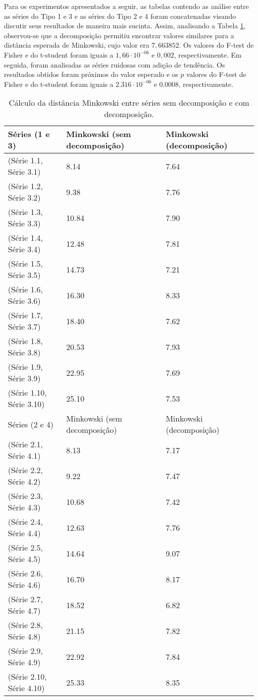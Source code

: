 Para os experimentos apresentados a seguir, as tabelas contendo as análise entre as séries do Tipo 1 e 3 e as séries do Tipo 2 e 4 foram concatenadas visando discutir seus resultados de maneira mais sucinta. Assim, analisando a Tabela \ref{Minkowski}, observou-se que a decomposição permitiu encontrar valores similares para a distância esperada de Minkowski, cujo valor era $7,663852$. Os valores do F-test de Fisher e do t-student foram iguais a $1,66 \cdot 10^{-06}$ e $0,002$, respectivamente. Em seguida, foram analisadas as séries ruidosas com adição de tendência. Os resultados obtidos foram próximos do valor esperado e os $p$ valores do F-test de Fisher e do t-student foram iguais a $2.316 \cdot 10^{-06}$ e $0.0008$, respectivamente.

\begin{table}[!ht]
\centering
\caption{Cálculo da distância Minkowski entre séries sem decomposição e com decomposição.}
\begin{tabular}{lll}
 \hline
Séries (1 e 3) & Minkowski (sem decomposição) & Minkowski (decomposição) \\
 \hline
 \hline
(Série 1.1, Série 3.1)  & 8.14 & 7.64\\ 
(Série 1.2, Série 3.2)  &  9.38 & 7.76 \\ 
(Série 1.3, Série 3.3)  & 10.84 & 7.90 \\ 
(Série 1.4, Série 3.4)  & 12.48 & 7.81 \\ 
(Série 1.5, Série 3.5)  & 14.73 & 7.21\\ 
(Série 1.6, Série 3.6)  & 16.30 & 8.33 \\
(Série 1.7, Série 3.7)  & 18.40 & 7.62 \\ 
(Série 1.8, Série 3.8)  & 20.53 & 7.93 \\ 
(Série 1.9, Série 3.9)  & 22.95 & 7.69 \\ 
(Série 1.10, Série 3.10)  & 25.10 & 7.53 \\ 
\hline
Séries (2 e 4) & Minkowski (sem decomposição) & Minkowski (decomposição) \\
\hline
\hline
(Série 2.1, Série 4.1) & 8.13  & 7.17\\ 
(Série 2.2, Série 4.2) & 9.22 & 7.47\\
(Série 2.3, Série 4.3) & 10.68  & 7.42 \\
(Série 2.4, Série 4.4) & 12.63 & 7.76 \\
(Série 2.5, Série 4.5) & 14.64 & 9.07 \\ 
(Série 2.6, Série 4.6) & 16.70 &  8.17 \\ 
(Série 2.7, Série 4.7) & 18.52 & 6.82 \\ 
(Série 2.8, Série 4.8) & 21.15 & 7.82 \\
(Série 2.9, Série 4.9) & 22.92 & 7.84 \\
(Série 2.10, Série 4.10) & 25.33 & 8.35 \\
 \hline
\end{tabular}
\label{Minkowski}
\end{table}


